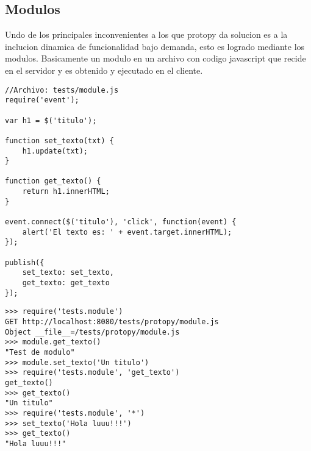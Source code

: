 \subsection*{Modulos}
Undo de los principales inconvenientes a los que protopy da solucion es a la inclucion dinamica de funcionalidad bajo demanda,
esto es logrado mediante los modulos.
Basicamente un modulo en un archivo con codigo javascript que recide en el servidor y es obtenido y ejecutado en el cliente.

\begin{lstlisting}[style=javascript,label=estructura-modulo,caption=Estructura de un modulo]
//Archivo: tests/module.js
require('event');

var h1 = $('titulo');

function set_texto(txt) {
    h1.update(txt);
}

function get_texto() {
    return h1.innerHTML;
}

event.connect($('titulo'), 'click', function(event) {
    alert('El texto es: ' + event.target.innerHTML);
});

publish({
    set_texto: set_texto,
    get_texto: get_texto
});
\end{lstlisting}

\begin{lstlisting}[style=consola,label=estructura-modulo-test,caption=Test]
>>> require('tests.module')
GET http://localhost:8080/tests/protopy/module.js
Object __file__=/tests/protopy/module.js
>>> module.get_texto()
"Test de modulo"
>>> module.set_texto('Un titulo')
>>> require('tests.module', 'get_texto')
get_texto()
>>> get_texto()
"Un titulo"
>>> require('tests.module', '*')
>>> set_texto('Hola luuu!!!')
>>> get_texto()
"Hola luuu!!!"
\end{lstlisting}
